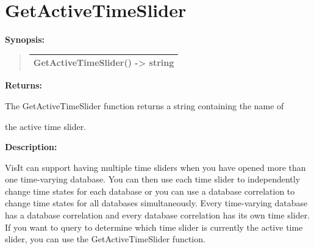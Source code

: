 \documentclass[letterpaper,10pt,english]{sphinxmanual}
\begin{document}
\section{GetActiveTimeSlider}
\label{functions:getactivetimeslider}
\begin{DUlineblock}{0em}
\item[] \textbf{Synopsis:}
\end{DUlineblock}
\begin{quote}

\begin{tabulary}{\linewidth}{|L|}
\hline

GetActiveTimeSlider() -\textgreater{} string
\\
\hline\end{tabulary}

\end{quote}

\begin{DUlineblock}{0em}
\item[] 
\item[] \textbf{Returns:}
\item[] The GetActiveTimeSlider function returns a string containing the name of
\item[] the active time slider.
\item[] 
\item[] \textbf{Description:}
\item[] VisIt can support having multiple time sliders when you have opened more
than one time-varying database. You can then use each time slider to
independently change time states for each database or you can use a
database correlation to change time states for all databases
simultaneously. Every time-varying database has a database correlation and
every database correlation has its own time slider. If you want to query to
determine which time slider is currently the active time slider, you can
use the GetActiveTimeSlider function.
\end{DUlineblock}

\begin{DUlineblock}{0em}
\item[] 
\end{DUlineblock}
\end{document}
